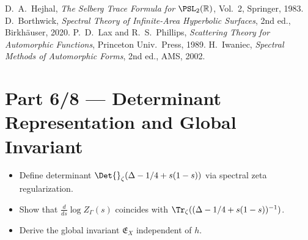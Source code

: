 \begin{thebibliography}{9}
 D.~A.~Hejhal, \emph{The Selberg Trace Formula for $\PSL_2(\mathbb{R})$}, Vol.~2, Springer, 1983. %
 D.~Borthwick, \emph{Spectral Theory of Infinite-Area Hyperbolic Surfaces}, 2nd ed., Birkhäuser, 2020. %
 P.~D.~Lax and R.~S.~Phillips, \emph{Scattering Theory for Automorphic Functions}, Princeton Univ.\ Press, 1989. %
 H.~Iwaniec, \emph{Spectral Methods of Automorphic Forms}, 2nd ed., AMS, 2002. %
\end{thebibliography}


\section*{Part 6/8 — Determinant Representation and Global Invariant}\relax\hspace{0pt}

\begin{tcolorbox}[colback=gray!4,colframe=gray!45,title={Scope • C11–C13 (Analytic Determinants)}] %
\begin{itemize}
  \item Define determinant $\Det{}_\zeta(\Delta-1/4+s(1-s))$ via spectral zeta regularization. %
  \item Show that $\frac{d}{ds}\log Z_\Gamma(s)$ coincides with $\Tr_\zeta((\Delta-1/4+s(1-s))^{-1})$. %
  \item Derive the global invariant $\mathfrak{E}_X$ independent of $h$. %
\end{itemize}
\end{tcolorbox}

